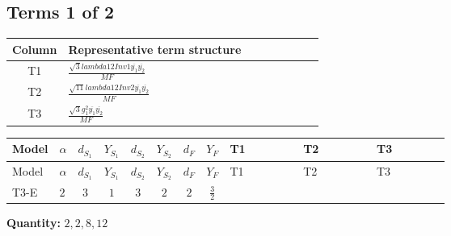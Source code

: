 \documentclass[8pt]{article}
\begin{document}
\begin{landscape}
\subsection*{Terms 1 of 2}
\begin{center}
\begin{tabular}{@{}c >{\raggedright\arraybackslash}p{0.82\linewidth}@{}}
\toprule
Column & Representative term structure \\
\midrule
T1 & \(\displaystyle \frac{\sqrt{3} lambda12Inv1 \overline{y_{1}} \overline{y_{2}}}{MF}\) \\
\midrule
T2 & \(\displaystyle \frac{\sqrt{11} lambda12Inv2 \overline{y_{1}} \overline{y_{2}}}{MF}\) \\
\midrule
T3 & \(\displaystyle \frac{\sqrt{3} g_{1}^{2} \overline{y_{1}} \overline{y_{2}}}{MF}\) \\
\midrule
\bottomrule
\end{tabular}
\end{center}
\smallskip
\tiny
\begin{longtable}{@{}llcccccc >{\raggedright\arraybackslash}p{0.21\linewidth} >{\raggedright\arraybackslash}p{0.21\linewidth} >{\raggedright\arraybackslash}p{0.21\linewidth}@{}}
\toprule
Model & $\alpha$ & $d_{S_1}$ & $Y_{S_1}$ & $d_{S_2}$ & $Y_{S_2}$ & $d_F$ & $Y_F$ & T1 & T2 & T3 \\
\midrule
\endfirsthead
\toprule
Model & $\alpha$ & $d_{S_1}$ & $Y_{S_1}$ & $d_{S_2}$ & $Y_{S_2}$ & $d_F$ & $Y_F$ & T1 & T2 & T3 \\
\midrule
\endhead
T3-E & $2$ & $3$ & $1$ & $3$ & $2$ & $2$ & $\frac{3}{2}$ & \scriptsize\adjustbox{max width=\linewidth}{$\begin{gathered} - \frac{\sqrt{3} lambda12Inv1 \overline{y_{1}} \overline{y_{2}}}{6 MF}\end{gathered}$} & \scriptsize\adjustbox{max width=\linewidth}{$\begin{gathered} \frac{3 \sqrt{11} lambda12Inv2 \overline{y_{1}} \overline{y_{2}}}{22 MF}\end{gathered}$} & \scriptsize\adjustbox{max width=\linewidth}{$\begin{gathered} \frac{9 \sqrt{3} g_{1}^{2} \overline{y_{1}} \overline{y_{2}}}{8 MF}\end{gathered}$} \\
\midrule
\bottomrule
\end{longtable}
\clearpage
\noindent\textbf{Quantity: }$\mathrm{2,2,8,12}$\par\smallskip

\end{landscape}
\end{document}

